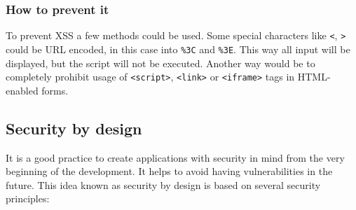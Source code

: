 \documentclass[a4paper]{article}
\begin{document}
\subsubsection{How to prevent it}

To prevent XSS a few methods could be used. Some special characters like
\texttt{<}, \texttt{>} could be URL encoded, in this case into \texttt{\%3C} and
\texttt{\%3E}. This way all input will be displayed, but the script will not be
executed. Another way would be to completely prohibit usage of
\texttt{<script>}, \texttt{<link>} or \texttt{<iframe>} tags in HTML-enabled
forms.\autocite{wahh}

\newpage

\subsection{Security by design}

It is a good practice to create applications with security in mind from the very
beginning of the development. It helps to avoid having vulnerabilities in the
future. This idea known as security by design is based on several security
principles\autocite{sbd}:
\end{document}
